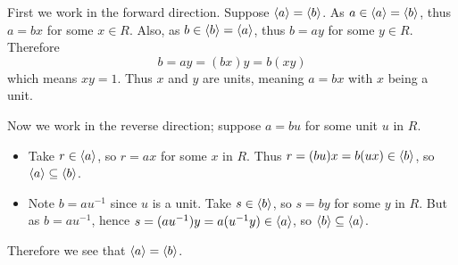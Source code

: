 \begin{questions}
    \item First we work in the forward direction. Suppose $\left\langle a\right\rangle = \left\langle b\right\rangle$. As $a \in \left\langle a\right\rangle = \left\langle b\right\rangle$, thus $a = bx$ for some $x \in R$. Also, as $b \in \left\langle b\right\rangle = \left\langle a\right\rangle$, thus $b = ay$ for some $y \in R$. Therefore
    \[
        b = ay = (bx)y = b(xy)
    \]
    which means $xy = 1$. Thus $x$ and $y$ are units, meaning $a = bx$ with $x$ being a unit.

    Now we work in the reverse direction; suppose $a = bu$ for some unit $u$ in $R$.
    \begin{itemize}
        \item Take $r \in \left\langle a\right\rangle$, so $r = ax$ for some $x$ in $R$. Thus $r = (bu)x = b(ux) \in \left\langle b\right\rangle$, so $\left\langle a\right\rangle \subseteq \left\langle b\right\rangle$.
        \item Note $b = au^{-1}$ since $u$ is a unit. Take $s \in \left\langle b\right\rangle$, so $s = by$ for some $y$ in $R$. But as $b = au^{-1}$, hence $s = (au^{-1})y = a(u^{-1}y) \in \left\langle a\right\rangle$, so $\left\langle b\right\rangle \subseteq \left\langle a\right\rangle$.
    \end{itemize}
    Therefore we see that $\left\langle a\right\rangle = \left\langle b\right\rangle$.
\end{questions}

